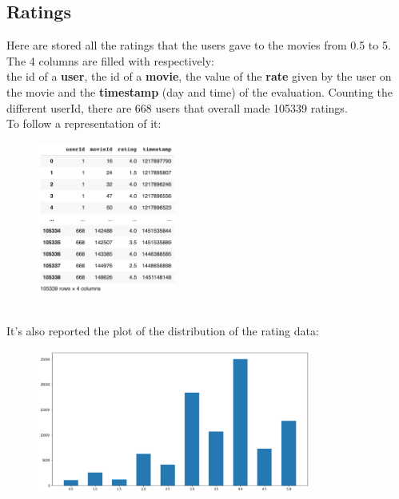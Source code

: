 \documentclass{article}
\begin{document}
\subsection{Ratings}
Here are stored all the ratings that the users gave to the movies from 0.5 to 5. The 4 columns are filled with respectively: \\the id of a \textbf{user}, the id of a \textbf{movie}, the value of the \textbf{rate} given by the user on the movie and the \textbf{timestamp} (day and time) of the evaluation. Counting the different userId, there are 668 users that overall made 105339 ratings. \\
To follow a representation of it:
\begin{figure}[ht]
      \begin{center}
            \includegraphics[width=0.4\textwidth]{images/ratings data.png}
      \end{center}
\end{figure}\\
It's also reported the plot of the distribution of the rating data:
\begin{figure}[ht]
      \begin{center}
            \includegraphics[width=0.8\textwidth]{images/rating distributions.png}
      \end{center}
\end{figure}
\end{document}
